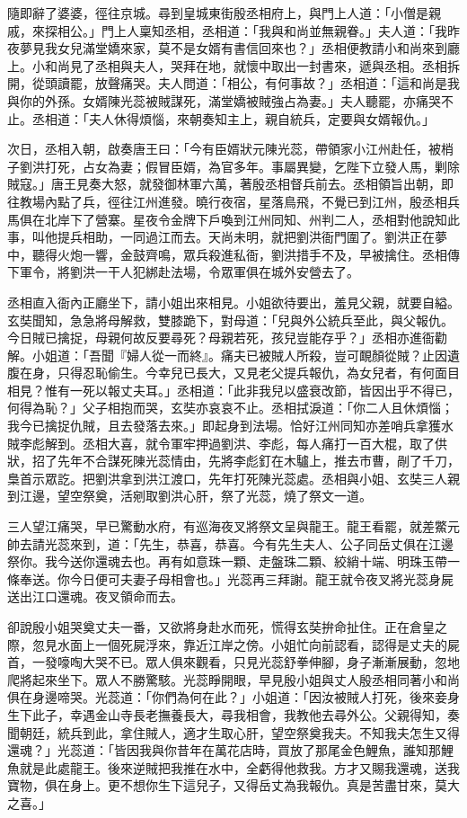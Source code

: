 隨即辭了婆婆，徑往京城。尋到皇城東街殷丞相府上，與門上人道：「小僧是親戚，來探相公。」門上人稟知丞相，丞相道：「我與和尚並無親眷。」夫人道：「我昨夜夢見我女兒滿堂嬌來家，莫不是女婿有書信回來也？」丞相便教請小和尚來到廳上。小和尚見了丞相與夫人，哭拜在地，就懷中取出一封書來，遞與丞相。丞相拆開，從頭讀罷，放聲痛哭。夫人問道：「相公，有何事故？」丞相道：「這和尚是我與你的外孫。女婿陳光蕊被賊謀死，滿堂嬌被賊強占為妻。」夫人聽罷，亦痛哭不止。丞相道：「夫人休得煩惱，來朝奏知主上，親自統兵，定要與女婿報仇。」

次日，丞相入朝，啟奏唐王曰：「今有臣婿狀元陳光蕊，帶領家小江州赴任，被梢子劉洪打死，占女為妻；假冒臣婿，為官多年。事屬異變，乞陛下立發人馬，剿除賊寇。」唐王見奏大怒，就發御林軍六萬，著殷丞相督兵前去。丞相領旨出朝，即往教場內點了兵，徑往江州進發。曉行夜宿，星落鳥飛，不覺已到江州，殷丞相兵馬俱在北岸下了營寨。星夜令金牌下戶喚到江州同知、州判二人，丞相對他說知此事，叫他提兵相助，一同過江而去。天尚未明，就把劉洪衙門圍了。劉洪正在夢中，聽得火炮一響，金鼓齊鳴，眾兵殺進私衙，劉洪措手不及，早被擒住。丞相傳下軍令，將劉洪一干人犯綁赴法場，令眾軍俱在城外安營去了。

丞相直入衙內正廳坐下，請小姐出來相見。小姐欲待要出，羞見父親，就要自縊。玄奘聞知，急急將母解救，雙膝跪下，對母道：「兒與外公統兵至此，與父報仇。今日賊已擒捉，母親何故反要尋死？母親若死，孩兒豈能存乎？」丞相亦進衙勸解。小姐道：「吾聞『婦人從一而終』。痛夫已被賊人所殺，豈可靦顏從賊？止因遺腹在身，只得忍恥偷生。今幸兒已長大，又見老父提兵報仇，為女兒者，有何面目相見？惟有一死以報丈夫耳。」丞相道：「此非我兒以盛衰改節，皆因出乎不得已，何得為恥？」父子相抱而哭，玄奘亦哀哀不止。丞相拭淚道：「你二人且休煩惱；我今已擒捉仇賊，且去發落去來。」即起身到法場。恰好江州同知亦差哨兵拿獲水賊李彪解到。丞相大喜，就令軍牢押過劉洪、李彪，每人痛打一百大棍，取了供狀，招了先年不合謀死陳光蕊情由，先將李彪釘在木驢上，推去市曹，剮了千刀，梟首示眾訖。把劉洪拿到洪江渡口，先年打死陳光蕊處。丞相與小姐、玄奘三人親到江邊，望空祭奠，活剜取劉洪心肝，祭了光蕊，燒了祭文一道。

三人望江痛哭，早已驚動水府，有巡海夜叉將祭文呈與龍王。龍王看罷，就差鱉元帥去請光蕊來到，道：「先生，恭喜，恭喜。今有先生夫人、公子同岳丈俱在江邊祭你。我今送你還魂去也。再有如意珠一顆、走盤珠二顆、絞綃十端、明珠玉帶一條奉送。你今日便可夫妻子母相會也。」光蕊再三拜謝。龍王就令夜叉將光蕊身屍送出江口還魂。夜叉領命而去。

卻說殷小姐哭奠丈夫一番，又欲將身赴水而死，慌得玄奘拚命扯住。正在倉皇之際，忽見水面上一個死屍浮來，靠近江岸之傍。小姐忙向前認看，認得是丈夫的屍首，一發嚎啕大哭不已。眾人俱來觀看，只見光蕊舒拳伸腳，身子漸漸展動，忽地爬將起來坐下。眾人不勝驚駭。光蕊睜開眼，早見殷小姐與丈人殷丞相同著小和尚俱在身邊啼哭。光蕊道：「你們為何在此？」小姐道：「因汝被賊人打死，後來妾身生下此子，幸遇金山寺長老撫養長大，尋我相會，我教他去尋外公。父親得知，奏聞朝廷，統兵到此，拿住賊人，適才生取心肝，望空祭奠我夫。不知我夫怎生又得還魂？」光蕊道：「皆因我與你昔年在萬花店時，買放了那尾金色鯉魚，誰知那鯉魚就是此處龍王。後來逆賊把我推在水中，全虧得他救我。方才又賜我還魂，送我寶物，俱在身上。更不想你生下這兒子，又得岳丈為我報仇。真是苦盡甘來，莫大之喜。」

